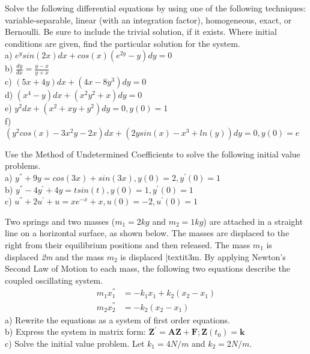 \documentclass[12pt,letterpaper, onecolumn]{exam}
\begin{document}
\begin{questions}
    \question[6 Marks] Solve the following differential equations by using one of the following techniques: variable-separable, linear (with an integration factor), homogeneous, exact, or Bernoulli. Be sure to include the trivial solution, if it exists. Where initial conditions are given, find the particular solution for the system. \\
              a) $e^y sin(2x)dx + cos(x) (e^{2y} - y) dy = 0$ \\
              b) $\frac{dy}{dx} = \frac{y - x}{y + x}$ \\
              c) $(5x + 4y)dx + (4x - 8y^3)dy = 0$ \\
              d) $(x^4 - y)dx + (x^2y^2 + x)dy = 0$ \\
              e) $y^2 dx + (x^2 + xy + y^2)dy = 0, y(0) = 1$ \\
              f) $(y^2 cos(x) - 3x^2y - 2x) dx + (2y sin(x) - x^3 + ln(y))dy = 0, y(0) = e$
    \droppoints
    
    \question[6 Marks] Use the Method of Undetermined Coefficients to solve the following initial value problems.\\
              a) $y^{''} + 9y = cos(3x) + sin(3x), y(0) = 2, y^{'}(0)=1$\\
              b) $y^{''} - 4y^{'} + 4y = t sin(t), y(0) = 1, y^{'}(0) = 1$\\
              c) $u^{''} + 2u^{'} + u = x e^{-x} + x, u(0) = -2, u^{'}(0) = 1$
    \droppoints
    
    \question[4 Marks] Two springs and two masses ($m_1 = 2kg$ and $m_2 = 1kg$) are attached in a straight line on a horizontal surface, as shown below. The masses are displaced to the right from their equilibrium positions and then released. The mass $m_1$ is displaced \textit{2m} and the mass $m_2$ is displaced |textit{3m}. By applying Newton's Second Law of Motion to each mass, the following two equations describe the coupled oscillating system.\\
             \begin{equation}
             \begin{split}
                 m_1 x_{1}^{''} & = -k_1 x_1 + k_2 (x_2 - x_1) \\
                 m_2 x_{2}^{''} & = -k_2 (x_2 - x_1) 
             \end{split}
             \end{equation}
             a) Rewrite the equations as a system of first order equations. \\
             b) Express the system in matrix form: $\mathbf{Z}^{'} = \mathbf{A}\mathbf{Z} + \mathbf{F}; \mathbf{Z}(t_0) = \mathbf{k}$ \\
             c) Solve the initial value problem. Let $k_1 = 4 N/m$ and $k_2 = 2 N/m$.
    \droppoints


\end{questions}
\end{document}
